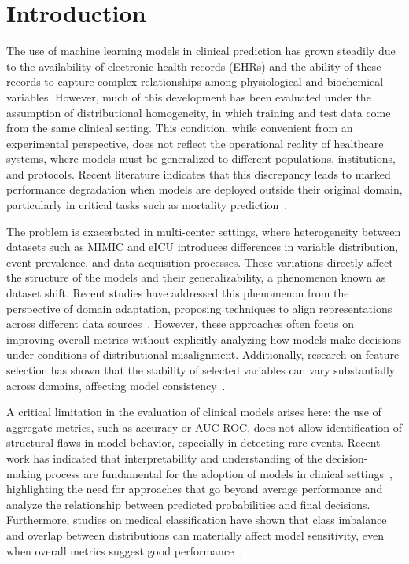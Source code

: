 \documentclass[utf8]{FrontiersinHarvard} %
\begin{document}
\section{Introduction}

The use of machine learning models in clinical prediction has grown steadily due to the availability of electronic health records (EHRs) and the ability of these records to capture complex relationships among physiological and biochemical variables. However, much of this development has been evaluated under the assumption of distributional homogeneity, in which training and test data come from the same clinical setting. This condition, while convenient from an experimental perspective, does not reflect the operational reality of healthcare systems, where models must be generalized to different populations, institutions, and protocols. Recent literature indicates that this discrepancy leads to marked performance degradation when models are deployed outside their original domain, particularly in critical tasks such as mortality prediction~\cite{Abdillah2024,Denada2025}.

The problem is exacerbated in multi-center settings, where heterogeneity between datasets such as MIMIC and eICU introduces differences in variable distribution, event prevalence, and data acquisition processes. These variations directly affect the structure of the models and their generalizability, a phenomenon known as dataset shift. Recent studies have addressed this phenomenon from the perspective of domain adaptation, proposing techniques to align representations across different data sources~\citealp{Tayal2025}. However, these approaches often focus on improving overall metrics without explicitly analyzing how models make decisions under conditions of distributional misalignment. Additionally, research on feature selection has shown that the stability of selected variables can vary substantially across domains, affecting model consistency~\citet{Vlasic2025}.

A critical limitation in the evaluation of clinical models arises here: the use of aggregate metrics, such as accuracy or AUC-ROC, does not allow identification of structural flaws in model behavior, especially in detecting rare events. Recent work has indicated that interpretability and understanding of the decision-making process are fundamental for the adoption of models in clinical settings~\citet{Oh2024}, highlighting the need for approaches that go beyond average performance and analyze the relationship between predicted probabilities and final decisions. Furthermore, studies on medical classification have shown that class imbalance and overlap between distributions can materially affect model sensitivity, even when overall metrics suggest good performance~\citet{Ye2025}.
\end{document}
